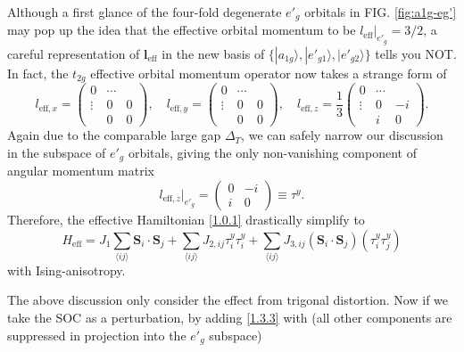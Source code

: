 \documentclass[10pt,nofootinbib,letterpaper]{revtex4}
\begin{document}
		Although a first glance of the four-fold degenerate $e'_g$ orbitals in FIG. \ref{fig:a1g-eg'} may pop up the idea that the effective orbital momentum to be $l_{\text{eff}}|_{e'_g}=3/2$, a careful representation of $\bm{l}_{\text{eff}}$ in the new basis of $\{|a_{1g}\rangle,|e'_{g1}\rangle,|e'_{g2}\rangle\}$ tells you NOT. In fact, the $t_{2g}$ effective orbital momentum operator now takes a strange form of
		\begin{equation}\label{1.3.1}
			l_{\text{eff},x}=\left(\begin{array}{c|cc}
				0 & \cdots &\\
				\hline
				\vdots & 0 & 0\\
				 & 0& 0
			\end{array}\right),\quad
			l_{\text{eff},y}=\left(\begin{array}{c|cc}
				0 & \cdots &\\
				\hline
				\vdots & 0 & 0\\
				 & 0& 0
			\end{array}\right),\quad
			l_{\text{eff},z}=\dfrac{1}{3}\left(\begin{array}{c|cc}
				0 & \cdots &\\
				\hline
				\vdots & 0 & -i\\
				 & i & 0
			\end{array}\right).
		\end{equation}
		Again due to the comparable large gap $\Delta_T$, we can safely narrow our discussion in the subspace of $e'_g$ orbitals, giving the only non-vanishing component of angular momentum matrix
		\begin{equation}\label{1.3.2}
			l_{\text{eff},z}|_{e'_g}=\left(\begin{array}{cc}
				0 &-i\\i & 0
			\end{array}\right)\equiv\tau^y.
		\end{equation}
		Therefore, the effective Hamiltonian \eqref{1.0.1} drastically simplify to
		\begin{equation}\label{1.3.3}
			H_{\text{eff}}=J_1\sum_{\langle ij \rangle}\bm{S}_i\cdot\bm{S}_j+\sum_{\langle ij \rangle}J_{2,ij}\tau_i^y\tau_i^y+\sum_{\langle ij \rangle }J_{3,ij}(\bm{S}_i\cdot\bm{S}_j)(\tau_i^y\tau_j^y)
		\end{equation}
		with Ising-anisotropy.\par
		The above discussion only consider the effect from trigonal distortion. Now if we take the SOC as a perturbation, by adding \eqref{1.3.3} with (all other components are suppressed in projection into the $e'_g$ subspace)
\end{document}
